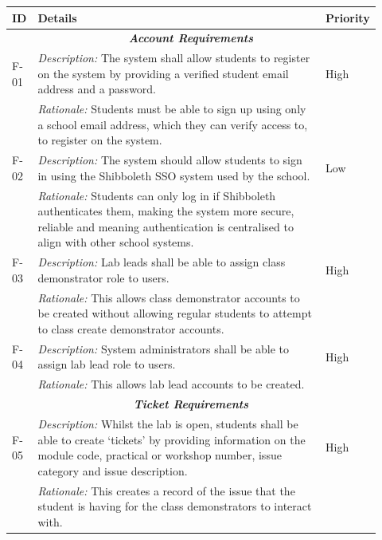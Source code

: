 \begin{table}[H]
\small
\begin{tabular}{|p{0.05\linewidth} | p{0.78\linewidth} |p{0.09\linewidth}|}
 \hline
 \textbf{ID} & \textbf{Details} & \textbf{Priority} \\
 \hline
 
 \multicolumn{3}{c}{\textit{\textbf{Account Requirements}}}\\
 
 \hline
 F-01 & \textit{Description:} The system shall allow students to register on the system by providing a verified student email address and a password. & High\\
  \cline{2-2}
  & \textit{Rationale:} Students must be able to sign up using only a school email address, which they can verify access to, to register on the system. & \\

  
   \hline\hline
 F-02 & \textit{Description:} The system should allow students to sign in using the Shibboleth SSO system used by the school. & Low\\
  \cline{2-2}
  & \textit{Rationale:} Students can only log in if Shibboleth authenticates them, making the system more secure, reliable and meaning authentication is centralised to align with other school systems. & \\

  
     \hline\hline
 F-03 & \textit{Description:} Lab leads shall be able to assign class demonstrator role to users. & High\\
  \cline{2-2}
  & \textit{Rationale:} This allows class demonstrator accounts to be created without allowing regular students to attempt to class create demonstrator accounts. & \\

  
       \hline\hline
 F-04 & \textit{Description:} System administrators shall be able to assign lab lead role to users. & High\\
  \cline{2-2}
  & \textit{Rationale:} This allows lab lead accounts to be created. & \\
  \hline
  
   \multicolumn{3}{c}{\textit{\textbf{Ticket Requirements}}}\\
  
 \hline
 F-05 & \textit{Description:} Whilst the lab is open, students shall be able to create `tickets' by providing information on the module code, practical or workshop number, issue category and issue description. & High\\
  \cline{2-2}
  & \textit{Rationale:} This creates a record of the issue that the student is having for the class demonstrators to interact with. & \\


\end{tabular}
\end{table}
